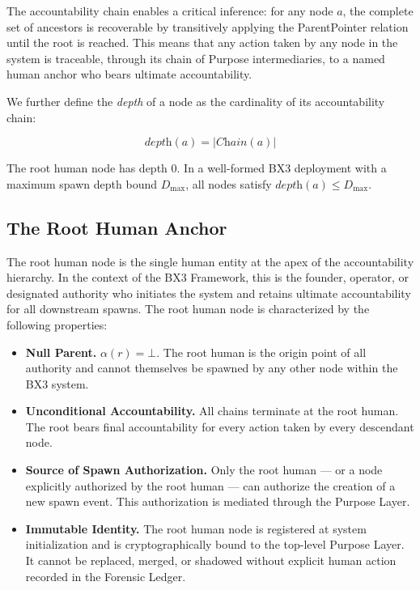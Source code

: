 The accountability chain enables a critical inference: for any node $a$, the complete set of ancestors is recoverable by transitively applying the ParentPointer relation until the root is reached. This means that any action taken by any node in the system is traceable, through its chain of Purpose intermediaries, to a named human anchor who bears ultimate accountability.

We further define the \textit{depth} of a node as the cardinality of its accountability chain:

\begin{equation}
\label{eq:depth}
\textit{depth}(a) = |\textit{Chain}(a)|
\end{equation}

The root human node has depth $0$. In a well-formed BX3 deployment with a maximum spawn depth bound $D_{\max}$, all nodes satisfy $\textit{depth}(a) \leq D_{\max}$.

\subsection{The Root Human Anchor}

The root human node is the single human entity at the apex of the accountability hierarchy. In the context of the BX3 Framework, this is the founder, operator, or designated authority who initiates the system and retains ultimate accountability for all downstream spawns. The root human node is characterized by the following properties:

\begin{itemize}[noitemsep]
    \item \textbf{Null Parent.} $\alpha(r) = \bot$. The root human is the origin point of all authority and cannot themselves be spawned by any other node within the BX3 system.
    \item \textbf{Unconditional Accountability.} All chains terminate at the root human. The root bears final accountability for every action taken by every descendant node.
    \item \textbf{Source of Spawn Authorization.} Only the root human — or a node explicitly authorized by the root human — can authorize the creation of a new spawn event. This authorization is mediated through the Purpose Layer.
    \item \textbf{Immutable Identity.} The root human node is registered at system initialization and is cryptographically bound to the top-level Purpose Layer. It cannot be replaced, merged, or shadowed without explicit human action recorded in the Forensic Ledger.
\end{itemize}

